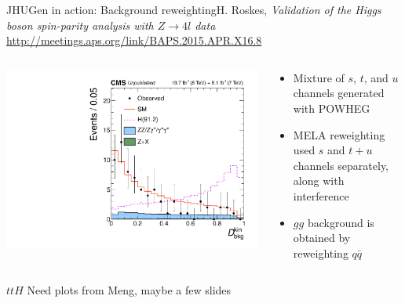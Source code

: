 \documentclass[usenames,dvipsnames,svgnames,table]{beamer}
\begin{document}
\begin{frame}{JHUGen in action: Background reweighting}{H. Roskes, \emph{Validation of the Higgs boson spin-parity
analysis with $Z\to 4l$ data}\\ \url{http://meetings.aps.org/link/BAPS.2015.APR.X16.8}}
\begin{columns}
\begin{column}{0.55\textwidth}
\includegraphics[width=.5\columnwidth]{reweighting/HVV/Z4lDbkgkin}
\end{column}
\begin{column}{0.45\textwidth}
\begin{itemize}
\item Mixture of $s$, $t$, and $u$ channels generated with POWHEG
\item MELA reweighting used $s$ and $t+u$ channels separately, along with interference
\item $gg$ background is obtained by reweighting $q\bar{q}$
\end{itemize}
\end{column}
\end{columns}
\end{frame}

\begin{frame}{$ttH$}
Need plots from Meng, maybe a few slides
\end{frame}
\end{document}
